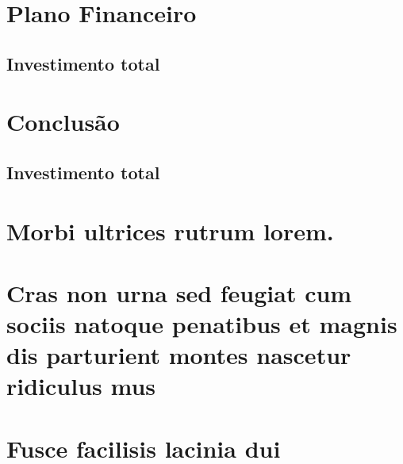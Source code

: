 \documentclass[
	12pt,				%
	openright,			%
	twoside,			%
	a4paper,			%
	english,			%
	french,				%
	spanish,			%
	brazil,				%
	]{abntex2}
\begin{document}

\chapter{Plano Financeiro}

\section{Investimento total}



\chapter{Conclusão}

\section{Investimento total}

	



\begin{anexosenv}

\partanexos

\chapter{Morbi ultrices rutrum lorem.}
\lipsum[30]

\chapter{Cras non urna sed feugiat cum sociis natoque penatibus et magnis dis
parturient montes nascetur ridiculus mus}

\lipsum[31]

\chapter{Fusce facilisis lacinia dui}

\lipsum[32]

\end{anexosenv}

\end{document}
